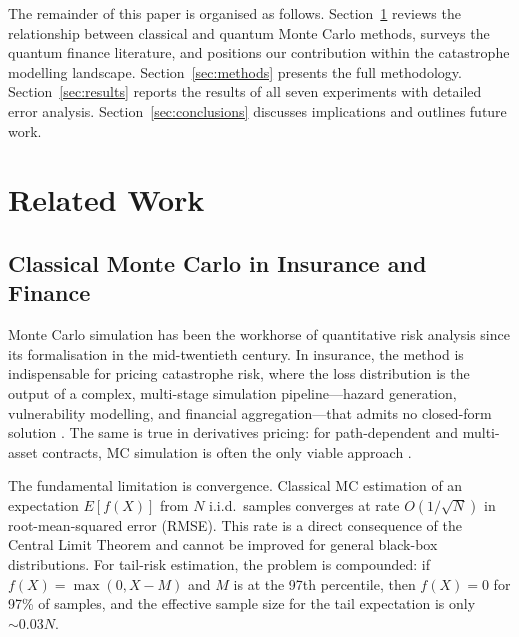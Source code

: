 \documentclass[11pt,a4paper]{article}
\begin{document}
The remainder of this paper is organised as follows. Section~\ref{sec:related_work} reviews the relationship between classical and quantum Monte Carlo methods, surveys the quantum finance literature, and positions our contribution within the catastrophe modelling landscape. Section~\ref{sec:methods} presents the full methodology. Section~\ref{sec:results} reports the results of all seven experiments with detailed error analysis. Section~\ref{sec:conclusions} discusses implications and outlines future work.


\section{Related Work}
\label{sec:related_work}

\subsection{Classical Monte Carlo in Insurance and Finance}

Monte Carlo simulation has been the workhorse of quantitative risk analysis since its formalisation in the mid-twentieth century. In insurance, the method is indispensable for pricing catastrophe risk, where the loss distribution is the output of a complex, multi-stage simulation pipeline---hazard generation, vulnerability modelling, and financial aggregation---that admits no closed-form solution \cite{Grossi2005}. The same is true in derivatives pricing: for path-dependent and multi-asset contracts, MC simulation is often the only viable approach \cite{Glasserman2003}.

The fundamental limitation is convergence. Classical MC estimation of an expectation $E[f(X)]$ from $N$ i.i.d.\ samples converges at rate $O(1/\sqrt{N})$ in root-mean-squared error (RMSE). This rate is a direct consequence of the Central Limit Theorem and cannot be improved for general black-box distributions. For tail-risk estimation, the problem is compounded: if $f(X) = \max(0, X - M)$ and $M$ is at the 97th percentile, then $f(X) = 0$ for 97\% of samples, and the effective sample size for the tail expectation is only $\sim 0.03N$.
\end{document}
